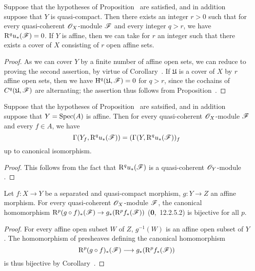 \begin{corollary}[1.4.12]
\label{3.1.4.12}
Suppose that the hypotheses of Proposition~ are satisfied, and in addition suppose that $Y$ is quasi-compact.
Then there exists an integer $r>0$ such that for every quasi-coherent $\mathscr{O}_X$-module $\mathscr{F}$ and every integer $q>r$, we have $\mathrm{R}^q u_*(\mathscr{F})=0$.
If $Y$ is affine, then we can take for $r$ an integer such that there exists a cover of $X$ consisting of $r$ open affine sets.
\end{corollary}

\begin{proof}
\label{proof-3.1.4.12}
As we can cover $Y$ by a finite number of affine open sets, we can reduce to proving the second assertion, by virtue of Corollary~.
If $\mathfrak{U}$ is a cover of $X$ by $r$ affine open sets, then we have $\mathrm{H}^q(\mathfrak{U},\mathscr{F})=0$ for $q>r$, since the cochains of $C^q(\mathfrak{U},\mathscr{F})$ are alternating; the assertion thus follows from Proposition~.
\end{proof}

\begin{corollary}[1.4.13]
\label{3.1.4.13}
Suppose that the hypotheses of Proposition~ are satsified, and in addition suppose that $Y=\operatorname{Spec}(A)$ is affine.
Then for every quasi-coherent $\mathscr{O}_X$-module $\mathscr{F}$ and every $f\in A$, we have
\[
  \Gamma(Y_f,\mathrm{R}^q u_*(\mathscr{F}))=(\Gamma(Y,\mathrm{R}^q u_*(\mathscr{F}))_f
\]
up to canonical isomorphism.
\end{corollary}

\begin{proof}
\label{proof-3.1.4.13}
This follows from the fact that $\mathrm{R}^q u_*(\mathscr{F})$ is a quasi-coherent $\mathscr{O}_Y$-module .
\end{proof}

\begin{proposition}[1.4.14]
\label{3.1.4.14}
Let $f:X\to Y$ be a separated and quasi-compact morphism, $g:Y\to Z$ an affine morphism.
For every quasi-coherent $\mathscr{O}_X$-module $\mathscr{F}$, the canonical homomorphism $\RR^p(g\circ f)_*(\sh{F})\to g_*(\RR^p f_*(\sh{F}))$ (\textbf{0},~12.2.5.2) is bijective for all $p$.
\end{proposition}

\begin{proof}
\label{proof-3.1.4.14}
For every affine open subset $W$ of $Z$, $g^{-1}(W)$ is an affine open subset of $Y$.
The homomorphism of presheaves defining the canonical homomorphism
\[
  \RR^p(g\circ f)_*(\sh{F})\to g_*(\RR^p f_*(\sh{F}))
\]
 is thus bijective by Corollary~.
\end{proof}

